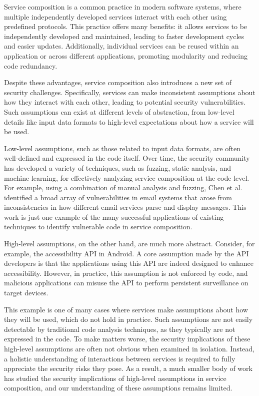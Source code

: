 \begin{dissertationintroduction}
Service composition is a common practice in modern software systems, where multiple independently developed services interact with each other using predefined protocols. This practice offers many benefits: it allows services to be independently developed and maintained, leading to faster development cycles and easier updates. Additionally, individual services can be reused within an application or 
across different applications, promoting modularity and reducing code redundancy.

Despite these advantages, service composition
also introduces a new set of security challenges. Specifically, services can make inconsistent assumptions about how they interact with each other, leading to potential security vulnerabilities. Such assumptions can exist at different levels of abstraction, from low-level details like input data formats to high-level expectations about how a service will be used. 

Low-level assumptions, such as those related to input data formats, are often well-defined and expressed in the code itself. Over time, the security community has developed a variety of techniques, such as fuzzing, static analysis, and machine learning, for effectively analyzing service composition at the code level. For example, using a combination of manual analysis and fuzzing, Chen et al.~\cite{chen2020composition} identified a broad array of vulnerabilities in email systems that arose from inconsistencies in how different email services parse and display messages. This work is just one example of the many successful applications of existing techniques to identify vulnerable code in service composition.

High-level assumptions, on the other hand, are much more abstract. Consider, for example, the accessibility API in Android. A core assumption made by the API developers is that the applications using this API are indeed designed to enhance accessibility. However, in practice, this assumption is not enforced by code, and malicious applications can misuse the API to perform persistent surveillance on target devices. 

This example is one of many cases where services make assumptions about how they will be used, which do not hold in practice. Such assumptions are not easily detectable by traditional code analysis techniques, as they typically are not expressed in the code. To make matters worse, the security implications of these high-level assumptions are often not obvious when examined in isolation. Instead, a holistic understanding of interactions between services is required to fully appreciate the security risks they pose. As a result, a much smaller body of work has studied the security implications of high-level assumptions in service composition, and our understanding of these assumptions remains limited.



\end{dissertationintroduction}
